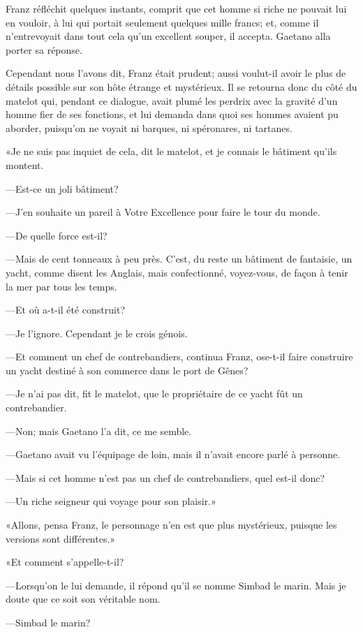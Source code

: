 Franz réfléchit quelques instants, comprit que cet homme si riche ne pouvait lui en vouloir, à lui qui portait seulement quelques mille francs; et, comme il n'entrevoyait dans tout cela qu'un excellent souper, il accepta. Gaetano alla porter sa réponse.

Cependant nous l'avons dit, Franz était prudent; aussi voulut-il avoir le plus de détails possible sur son hôte étrange et mystérieux. Il se retourna donc du côté du matelot qui, pendant ce dialogue, avait plumé les perdrix avec la gravité d'un homme fier de ses fonctions, et lui demanda dans quoi ses hommes avaient pu aborder, puisqu'on ne voyait ni barques, ni spéronares, ni tartanes.

«Je ne suis pas inquiet de cela, dit le matelot, et je connais le bâtiment qu'ils montent.

—Est-ce un joli bâtiment?

—J'en souhaite un pareil à Votre Excellence pour faire le tour du monde.

—De quelle force est-il?

—Mais de cent tonneaux à peu près. C'est, du reste un bâtiment de fantaisie, un yacht, comme disent les Anglais, mais confectionné, voyez-vous, de façon à tenir la mer par tous les temps.

—Et où a-t-il été construit?

—Je l'ignore. Cependant je le crois génois.

—Et comment un chef de contrebandiers, continua Franz, ose-t-il faire construire un yacht destiné à son commerce dans le port de Gênes?

—Je n'ai pas dit, fit le matelot, que le propriétaire de ce yacht fût un contrebandier.

—Non; mais Gaetano l'a dit, ce me semble.

—Gaetano avait vu l'équipage de loin, mais il n'avait encore parlé à personne.

—Mais si cet homme n'est pas un chef de contrebandiers, quel est-il donc?

—Un riche seigneur qui voyage pour son plaisir.»

«Allons, pensa Franz, le personnage n'en est que plus mystérieux, puisque les versions sont différentes.»

«Et comment s'appelle-t-il?

—Lorsqu'on le lui demande, il répond qu'il se nomme Simbad le marin. Mais je doute que ce soit son véritable nom.

—Simbad le marin?

